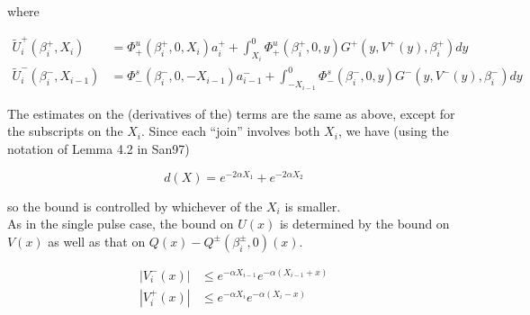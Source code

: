 \documentclass[12pt]{article}
\begin{document}
where

\begin{align*}
\tilde{U}_i^+(\beta_i^+, X_i) &= \Phi^u_+(\beta_i^+, 0, X_i) a_i^+ + \int_{X_i}^0 \Phi_+^u(\beta_i^+, 0, y) G^+(y, V^+(y),\beta_i^+)dy \\ 
\tilde{U}_i^-(\beta_i^-, X_{i-1}) &= \Phi^s_-(\beta_i^-, 0, -X_{i-1}) a_{i-1}^- + \int_{-X_{i-1}}^0 \Phi_-^s(\beta_i^-, 0, y) G^-(y, V^-(y),\beta_i^-)dy 
\end{align*}

The estimates on the (derivatives of the) terms are the same as above, except for the subscripts on the $X_i$. Since each ``join'' involves both $X_i$, we have (using the notation of Lemma 4.2 in San97)

\[
d(X) = e^{-2 \alpha X_1} + e^{-2 \alpha X_2}
\]

so the bound is controlled by whichever of the $X_i$ is smaller. \\

As in the single pulse case, the bound on $U(x)$ is determined by the bound on $V(x)$ as well as that on $Q(x) - Q^\pm(\beta_i^\pm, 0)(x)$.

\begin{align*}
|V_i^-(x)| &\leq e^{-\alpha X_{i-1}} e^{-\alpha(X_{i-1} + x)} \\
|V_i^+(x)| &\leq e^{-\alpha X_i} e^{-\alpha(X_i - x)} \\
\end{align*}
\end{document}
